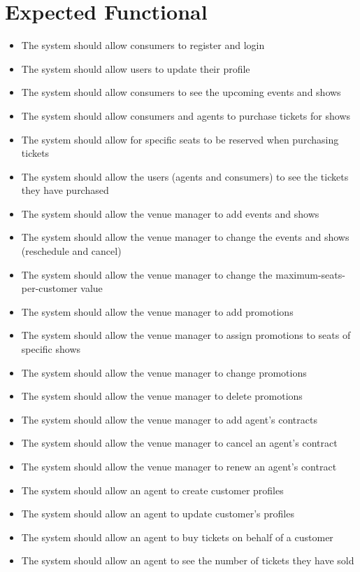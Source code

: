 \section{Expected Functional}

\begin{itemize} %
  \item The system should allow consumers to register and login
  \item The system should allow users to update their profile
  \item The system should allow consumers to see the upcoming events and shows
  \item The system should allow consumers and agents to purchase tickets for shows
  \item The system should allow for specific seats to be reserved when purchasing tickets
  \item The system should allow the users (agents and consumers) to see the tickets they have purchased
  \item The system should allow the venue manager to add events and shows
  \item The system should allow the venue manager to change the events and shows (reschedule and cancel)
  \item The system should allow the venue manager to change the maximum-seats-per-customer value
  \item The system should allow the venue manager to add promotions
  \item The system should allow the venue manager to assign promotions to seats of specific shows
  \item The system should allow the venue manager to change promotions
  \item The system should allow the venue manager to delete promotions
  \item The system should allow the venue manager to add agent's contracts
  \item The system should allow the venue manager to cancel an agent's contract
  \item The system should allow the venue manager to renew an agent's contract
  \item The system should allow an agent to create customer profiles
  \item The system should allow an agent to update customer's profiles
  \item The system should allow an agent to buy tickets on behalf of a customer
  \item The system should allow an agent to see the number of tickets they have sold
\end{itemize}
